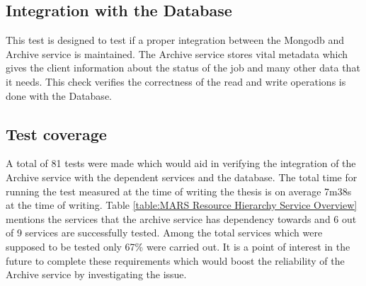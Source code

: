 \subsection{Integration with the Database}
This test is designed to test if a proper integration between the Mongodb and Archive service is maintained. The Archive service stores vital metadata
which gives the client information about the status of the job and many other data that it needs. This check verifies the correctness of the read and write 
operations is done with the Database. 

\subsection{Test coverage}
A total of 81 tests were made which would aid in verifying the integration of the Archive service with the dependent services and the database. The 
total time for running the test measured at the time of writing the thesis is on average 7m38s at the time of writing. Table \ref{table:MARS Resource Hierarchy Service Overview}
mentions the services that the archive service has dependency towards and 6 out of 9 services are successfully tested. Among the total services 
which were supposed to be tested only 67\%  were carried out. It is a point of interest in the future to complete these requirements which would boost the
reliability of the Archive service by investigating the issue. 
